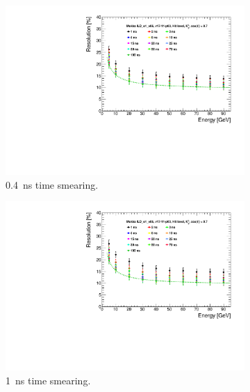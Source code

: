 \begin{figure}[htbp!]
  \centering
  \begin{subfigure}[t]{0.48\textwidth}
    \centering
    \includegraphics[width=1\linewidth]{../Thesis_Plots/ILD/Smearing_0.4ns/Plots/ShowerResoAbsolute_TimeCuts_Smearing1}
    \caption{\SI{0.4}{\nano\second} time smearing.} \label{fig:Reso0.4ns}
  \end{subfigure}
  \begin{subfigure}[t]{0.48\textwidth}
    \centering
    \includegraphics[width=1\linewidth]{../Thesis_Plots/ILD/Smearing_1ns/Plots/ShowerResoAbsolute_TimeCuts_Smearing2}
    \caption{\SI{1}{\nano\second} time smearing.} \label{fig:Reso1ns}
  \end{subfigure}
  \begin{subfigure}[t]{0.48\textwidth}

\end{subfigure}
\end{figure}

